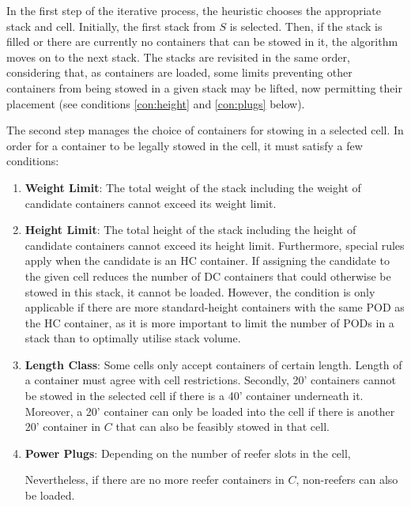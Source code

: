 \documentclass[preprint,11pt,3p]{elsarticle}
\begin{document}
In the first step of the iterative process, the heuristic chooses the appropriate stack and cell. Initially, the first stack from $S$ is selected. Then, if the stack is filled or there are currently no containers that can be stowed in it, the algorithm moves on to the next stack. The stacks are revisited in the same order, considering that, as containers are loaded, some limits preventing other containers from being stowed in a given stack may be lifted, now permitting their placement (see conditions \ref{con:height} and \ref{con:plugs} below). 

The second step manages the choice of containers for stowing in a selected cell. In order for a container to be legally stowed in the cell, it must satisfy a few conditions:
\begin{enumerate}[noitemsep]
    \item \textbf{Weight Limit}: The total weight of the stack including the weight of candidate containers cannot exceed its weight limit.
    \item \label{con:height} \textbf{Height Limit}: The total height of the stack including the height of candidate containers cannot exceed its height limit. Furthermore, special rules apply when the candidate is an HC container. If assigning the candidate to the given cell reduces the number of DC containers that could otherwise be stowed in this stack, it cannot be loaded. However, the condition is only applicable if there are more standard-height containers with the same POD as the HC container, as it is more important to limit the number of PODs in a stack than to optimally utilise stack volume.
    \item \textbf{Length Class}: Some cells only accept containers of certain length. Length of a container must agree with cell restrictions. Secondly, 20' containers cannot be stowed in the selected cell if there is a 40' container underneath it. Moreover, a 20' container can only be loaded into the cell if there is another 20' container in $C$ that can also be feasibly stowed in that cell.
    \item \label{con:plugs} \textbf{Power Plugs}: Depending on the number of reefer slots in the cell,
    Nevertheless, if there are no more reefer containers in $C$, non-reefers can also be loaded.    
\end{enumerate}
\end{document}
